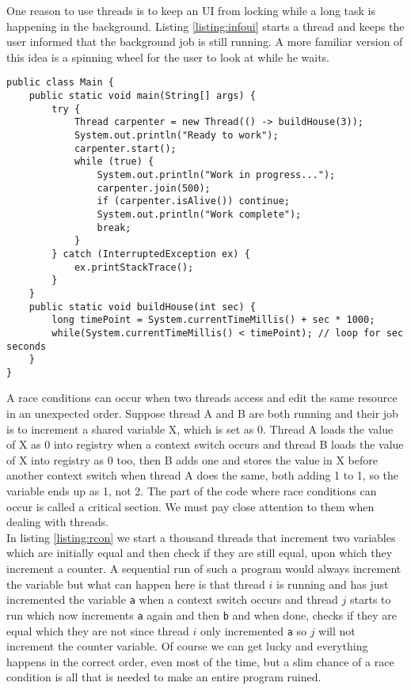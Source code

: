 One reason to use threads is to keep an UI from locking while a long task is happening in the background. Listing \ref{listing:infoui} starts a thread and keeps the user informed that the background job is still running. A more familiar version of this idea is a spinning wheel for the user to look at while he waits.

\begin{lstlisting}[style=A_Java, caption={\href{https://github.com/JonSteinn/AndroidDevelopment/blob/master/examples/lab2/javathreads/2/Main.java}{UI keeping user informed on progress}}, label={listing:infoui}]
public class Main {
    public static void main(String[] args) {
        try {
            Thread carpenter = new Thread(() -> buildHouse(3));
            System.out.println("Ready to work");
            carpenter.start();
            while (true) {
                System.out.println("Work in progress...");
                carpenter.join(500);
                if (carpenter.isAlive()) continue;
                System.out.println("Work complete");
                break;
            }
        } catch (InterruptedException ex) {
            ex.printStackTrace();
        }
    }
    public static void buildHouse(int sec) {
        long timePoint = System.currentTimeMillis() + sec * 1000;
        while(System.currentTimeMillis() < timePoint); // loop for sec seconds
    }
}
\end{lstlisting}

A race conditions can occur when two threads access and edit the same resource in an unexpected order. Suppose thread A and B are both running and their job is to increment a shared variable X, which is set as 0. Thread A loads the value of X as 0 into registry when a context switch occurs and thread B loads the value of X into registry as 0 too, then B adds one and stores the value in X before another context switch when thread A does the same, both adding 1 to 1, so the variable ends up as 1, not 2. The part of the code where race conditions can occur is called a critical section. We must pay close attention to them when dealing with threads.\\

In listing \ref{listing:rcon} we start a thousand threads that increment two variables which are initially equal and then check if they are still equal, upon which they increment a counter. A sequential run of such a program would always increment the variable but what can happen here is that thread $i$ is running and has just incremented the variable \texttt{a} when a context switch occurs and thread $j$ starts to run which now increments \texttt{a} again and then \texttt{b} and when done, checks if they are equal which they are not since thread $i$ only incremented \texttt{a} so $j$ will not increment the counter variable. Of course we can get lucky and everything happens in the correct order, even most of the time, but a slim chance of a race condition is all that is needed to make an entire program ruined.  

